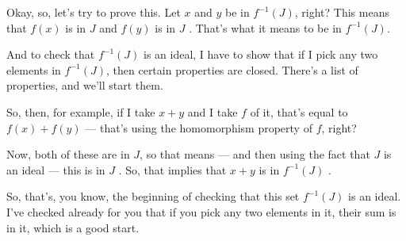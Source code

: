 \begin{speech}[00:10:33 - 00:11:51]
Okay, so, let's try to prove this. Let $x$ and $y$ be in $f^{-1}(J)$, right?  This means that $f(x)$ is in $J$ and $f(y)$ is in $J$ . That's what it means to be in $f^{-1}(J)$.

And to check that $f^{-1}(J)$ is an ideal, I have to show that if I pick any two elements in $f^{-1}(J)$, then certain properties are closed. There's a list of properties, and we'll start them.

So, then, for example, if I take $x + y$ and I take $f$ of it, that's equal to $f(x) + f(y)$ --- that's using the homomorphism property of $f$, right? 

Now, both of these are in $J$, so that means --- and then using the fact that $J$ is an ideal --- this is in $J$ . So, that implies that $x + y$ is in $f^{-1}(J)$ .

So, that's, you know, the beginning of checking that this set $f^{-1}(J)$ is an ideal. I've checked already for you that if you pick any two elements in it, their sum is in it, which is a good start.
\end{speech}

